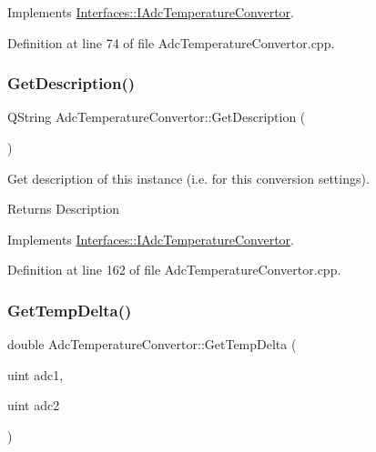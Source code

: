 Implements \hyperlink{class_interfaces_1_1_i_adc_temperature_convertor_a61cff0aa0590906acfb18c9b789dceb2}{Interfaces\+::\+I\+Adc\+Temperature\+Convertor}.



Definition at line 74 of file Adc\+Temperature\+Convertor.\+cpp.

\mbox{\label{class_adc_temperature_convertor_ad82afdddbac46a95b6da44e769180d10}} 
\subsubsection{\texorpdfstring{Get\+Description()}{GetDescription()}}
{\footnotesize\ttfamily Q\+String Adc\+Temperature\+Convertor\+::\+Get\+Description (\begin{DoxyParamCaption}{ }\end{DoxyParamCaption})\hspace{0.3cm}{\ttfamily [virtual]}}



Get description of this instance (i.\+e. for this conversion settings). 

\begin{DoxyReturn}{Returns}
Description 
\end{DoxyReturn}


Implements \hyperlink{class_interfaces_1_1_i_adc_temperature_convertor_a2f3b59be793c3ed43e880ef12e9749bc}{Interfaces\+::\+I\+Adc\+Temperature\+Convertor}.



Definition at line 162 of file Adc\+Temperature\+Convertor.\+cpp.

\mbox{\label{class_adc_temperature_convertor_a6742f0177d4dcd1aab1087b5d7512146}} 
\subsubsection{\texorpdfstring{Get\+Temp\+Delta()}{GetTempDelta()}}
{\footnotesize\ttfamily double Adc\+Temperature\+Convertor\+::\+Get\+Temp\+Delta (\begin{DoxyParamCaption}\item[{uint}]{adc1,  }\item[{uint}]{adc2 }\end{DoxyParamCaption})\hspace{0.3cm}{\ttfamily [virtual]}}



